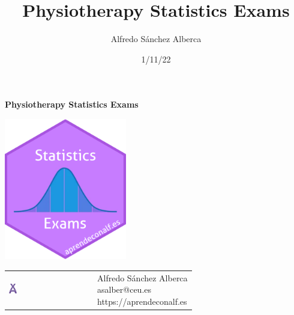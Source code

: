 \documentclass[
  a4paper,
]{scrreport}
\title{Physiotherapy Statistics Exams}
\author{Alfredo Sánchez Alberca}
\date{1/11/22}
\renewcommand*\contentsname{Table of contents}
\newcommand\contentsname{Table of contents}
\theoremstyle{definition}
\theoremstyle{remark}
\begin{document}
\begin{titlepage}

\begin{center}
\vspace*{5cm}

\Huge
{\textbf{\textsf{Physiotherapy Statistics Exams}}}

\vspace{0.5cm}
\LARGE
{\textbf{\textsf{}}}

\vspace{1.5cm}

\includegraphics[width=0.4\textwidth]{img/logos/sticker.png}
\end{center}

\vfill

\begin{flushleft}
\begin{tabular}{ll}
\includegraphics[width=0.1\textwidth]{img/logos/aprendeconalf.png} & \parbox[b]{5cm}{\Large\textsf{Alfredo
Sánchez
Alberca}\\ \textsf{asalber@ceu.es} \\ \textsf{https://aprendeconalf.es}}
\end{tabular}
\end{flushleft}
\end{titlepage}\ifdefined\Shaded\renewenvironment{Shaded}{\begin{tcolorbox}[breakable, interior hidden, sharp corners, frame hidden, enhanced, borderline west={3pt}{0pt}{shadecolor}, boxrule=0pt]}{\end{tcolorbox}}\fi

\renewcommand*\contentsname{Table of contents}
{
\hypersetup{linkcolor=}
\setcounter{tocdepth}{2}
\tableofcontents
}
\end{document}
